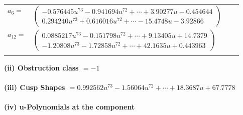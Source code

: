 \documentclass[1p]{elsarticle_modified}
\theoremstyle{definition}
\begin{document}
\begin{tabular}{m{7pt} m{180pt} m{7pt} m{180pt} }
\flushright $a_{6}=$&$\begin{pmatrix}-0.576445 u^{73}-0.941694 u^{72}+\cdots+3.90277 u-0.454644\\0.294240 u^{73}+0.616016 u^{72}+\cdots-15.4748 u-3.92866\end{pmatrix}$ \\
\flushright $a_{12}=$&$\begin{pmatrix}0.0885217 u^{73}-0.151798 u^{72}+\cdots+9.13405 u+14.7379\\-1.20808 u^{73}-1.72858 u^{72}+\cdots+42.1635 u+0.443963\end{pmatrix}$\\&\end{tabular}
\flushleft \textbf{(ii) Obstruction class $= -1$}\\~\\
\flushleft \textbf{(iii) Cusp Shapes $= 0.992562 u^{73}-1.56064 u^{72}+\cdots+18.3687 u+67.7778$}\\~\\
\newpage\renewcommand{\arraystretch}{1}
\flushleft \textbf{(iv) u-Polynomials at the component}\newline \\
\end{document}

